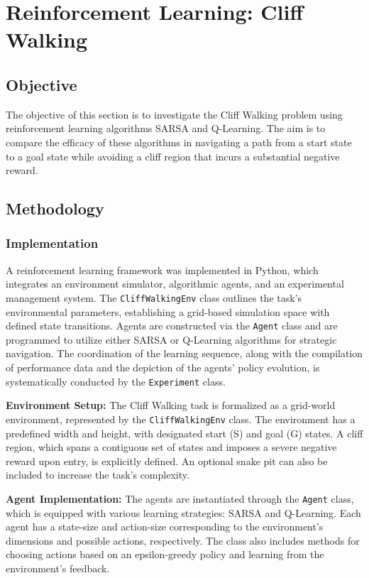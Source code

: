 \documentclass[12pt]{article}
\begin{document}
\section{Reinforcement Learning: Cliff Walking}

\subsection{Objective}
The objective of this section is to investigate the Cliff Walking problem using reinforcement learning algorithms SARSA and Q-Learning. The aim is to compare the efficacy of these algorithms in navigating a path from a start state to a goal state while avoiding a cliff region that incurs a substantial negative reward.

\subsection{Methodology}

\subsubsection{Implementation}

A reinforcement learning framework was implemented in Python, which integrates an environment simulator, algorithmic agents, and an experimental management system. The \texttt{CliffWalkingEnv} class outlines the task's environmental parameters, establishing a grid-based simulation space with defined state transitions. Agents are constructed via the \texttt{Agent} class and are programmed to utilize either SARSA or Q-Learning algorithms for strategic navigation. The coordination of the learning sequence, along with the compilation of performance data and the depiction of the agents' policy evolution, is systematically conducted by the \texttt{Experiment} class.


\textbf{Environment Setup:} The Cliff Walking task is formalized as a grid-world environment, represented by the \texttt{CliffWalkingEnv} class. The environment has a predefined width and height, with designated start (S) and goal (G) states. A cliff region, which spans a contiguous set of states and imposes a severe negative reward upon entry, is explicitly defined. An optional snake pit can also be included to increase the task's complexity.

\textbf{Agent Implementation:}
The agents are instantiated through the \texttt{Agent} class, which is equipped with various learning strategies: SARSA and Q-Learning. Each agent has a state-size and action-size corresponding to the environment's dimensions and possible actions, respectively. The class also includes methods for choosing actions based on an epsilon-greedy policy and learning from the environment's feedback.
\end{document}
